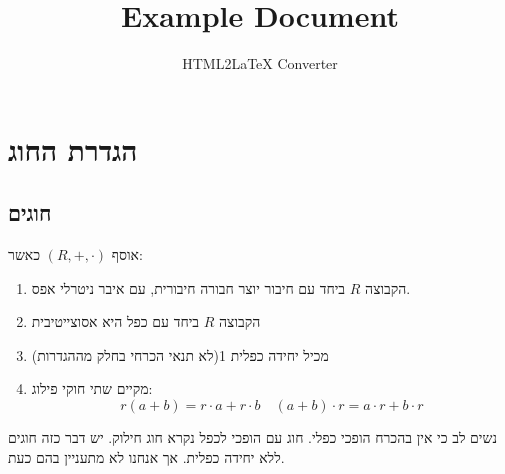 \documentclass{tstextbook}
\begin{document}
\title{Example Document}
\author{HTML2LaTeX Converter}
\maketitle

\section{הגדרת החוג}

\subsection{חוגים}

\begin{definition}[חוג]
אוסף \(\left( R,+,\cdot \right)\)  כאשר:

  \begin{enumerate}
    \item הקבוצה \(R\) ביחד עם חיבור יוצר חבורה חיבורית, עם איבר ניטרלי אפס. 


    \item הקבוצה \(R\) ביחד עם כפל היא אסוצייטיבית  


    \item מכיל יחידה כפלית 1(לא תנאי הכרחי בחלק מההגדרות) 


    \item מקיים שתי חוקי פילוג: 
$$r(a+b)=r\cdot a+r\cdot b\quad (a+b)\cdot r=a\cdot r+b\cdot r$$


  \end{enumerate}
\end{definition}
נשים לב כי אין בהכרח הופכי כפלי. חוג עם הופכי לכפל נקרא חוג חילוק. יש דבר כזה חוגים ללא יחידה כפלית. אך אנחנו לא מתעניין בהם כעת.
\end{document}
